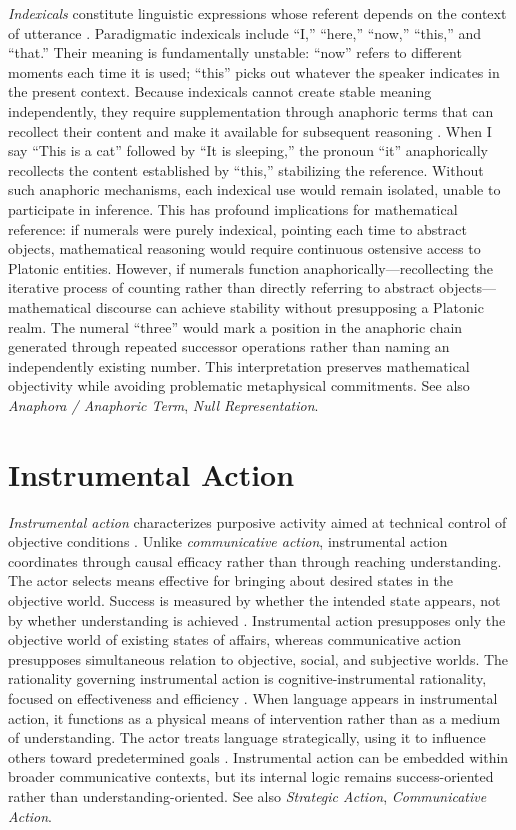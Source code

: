 \documentclass{book}
\begin{document}
\textit{Indexicals} constitute linguistic expressions whose referent depends on the context of utterance \parencite{brandom1994making}. Paradigmatic indexicals include ``I,'' ``here,'' ``now,'' ``this,'' and ``that.'' Their meaning is fundamentally unstable: ``now'' refers to different moments each time it is used; ``this'' picks out whatever the speaker indicates in the present context. Because indexicals cannot create stable meaning independently, they require supplementation through anaphoric terms that can recollect their content and make it available for subsequent reasoning \parencite{brandom1994making}. When I say ``This is a cat'' followed by ``It is sleeping,'' the pronoun ``it'' anaphorically recollects the content established by ``this,'' stabilizing the reference. Without such anaphoric mechanisms, each indexical use would remain isolated, unable to participate in inference. This has profound implications for mathematical reference: if numerals were purely indexical, pointing each time to abstract objects, mathematical reasoning would require continuous ostensive access to Platonic entities. However, if numerals function anaphorically---recollecting the iterative process of counting rather than directly referring to abstract objects---mathematical discourse can achieve stability without presupposing a Platonic realm. The numeral ``three'' would mark a position in the anaphoric chain generated through repeated successor operations rather than naming an independently existing number. This interpretation preserves mathematical objectivity while avoiding problematic metaphysical commitments. See also \textit{Anaphora / Anaphoric Term}, \textit{Null Representation}.

\section{Instrumental Action}

\textit{Instrumental action} characterizes purposive activity aimed at technical control of objective conditions \parencite{Habermas1984, Carspecken1995aa}. Unlike \textit{communicative action}, instrumental action coordinates through causal efficacy rather than through reaching understanding. The actor selects means effective for bringing about desired states in the objective world. Success is measured by whether the intended state appears, not by whether understanding is achieved \parencite{Habermas1984}. Instrumental action presupposes only the objective world of existing states of affairs, whereas communicative action presupposes simultaneous relation to objective, social, and subjective worlds. The rationality governing instrumental action is cognitive-instrumental rationality, focused on effectiveness and efficiency \parencite{Habermas1984}. When language appears in instrumental action, it functions as a physical means of intervention rather than as a medium of understanding. The actor treats language strategically, using it to influence others toward predetermined goals \parencite{habermas1992individuation}. Instrumental action can be embedded within broader communicative contexts, but its internal logic remains success-oriented rather than understanding-oriented. See also \textit{Strategic Action}, \textit{Communicative Action}.
\end{document}
